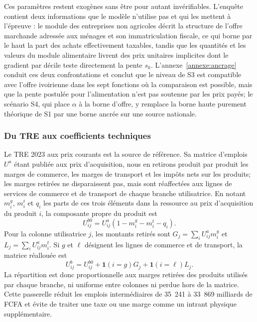 \documentclass[11pt,a4paper]{article}
\begin{document}
Ces paramètres restent exogènes sans être pour autant invérifiables. L'enquête
contient deux informations que le modèle n'utilise pas et qui les mettent à
l'épreuve : le module des entreprises non agricoles décrit la structure de
l'offre marchande adressée aux ménages et son immatriculation fiscale, ce qui
borne par le haut la part des achats effectivement taxables, tandis que les
quantités et les valeurs du module alimentaire livrent des prix unitaires
implicites \citep{deaton1988} dont le gradient par décile teste directement la
pente $s_k$.
L'annexe~\ref{annexe:ancrage} conduit ces deux confrontations et conclut que le
niveau de S3 est compatible avec l'offre ivoirienne dans les sept fonctions où
la comparaison est possible, mais que la pente postulée pour l'alimentation
n'est pas soutenue par les prix payés; le scénario S4, qui place $\alpha$ à la
borne d'offre, y remplace la borne haute purement théorique de S1 par une borne
ancrée sur une source nationale.

\subsubsection{Du TRE aux coefficients techniques}

Le TRE 2023 aux prix courants est la source de référence. Sa matrice d'emplois
$U^a$ étant publiée aux prix d'acquisition, nous en retirons produit par produit
les marges de commerce, les marges de transport et les impôts nets sur les
produits; les marges retirées ne disparaissent pas, mais sont réaffectées aux
lignes de services de commerce et de transport de chaque branche utilisatrice.
En notant $m_i^g$, $m_i^t$ et $q_i$ les parts de ces trois éléments dans la
ressource au prix d'acquisition du produit $i$, la composante propre du produit
est
\begin{equation}
U^{b0}_{ij}=U^{a}_{ij}(1-m_i^g-m_i^t-q_i).
\label{eq:basic-prices}
\end{equation}
Pour la colonne utilisatrice $j$, les montants retirés sont
$G_j=\sum_iU^a_{ij}m_i^g$ et $L_j=\sum_iU^a_{ij}m_i^t$. Si $g$ et $\ell$
désignent les lignes de commerce et de transport, la matrice réallouée est
\begin{equation}
U^b_{ij}=U^{b0}_{ij}+\mathbf 1(i=g)G_j+\mathbf 1(i=\ell)L_j.
\label{eq:margin-reallocation}
\end{equation}
La répartition est donc proportionnelle aux marges retirées des produits
utilisés par chaque branche, ni uniforme entre colonnes ni perdue hors de la
matrice. Cette passerelle réduit les emplois intermédiaires de 35~241 à 33~869
milliards de FCFA et évite de traiter une taxe ou une marge comme un intrant
physique supplémentaire.
\end{document}
